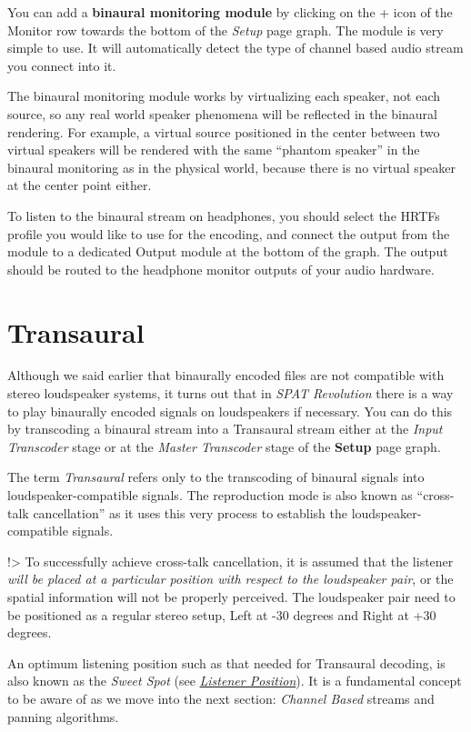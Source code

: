 \documentclass[
  letterpaper,
  DIV=11,
  numbers=noendperiod]{scrreport}
\begin{document}
You can add a \textbf{binaural monitoring module} by clicking on the +
icon of the Monitor row towards the bottom of the \emph{Setup} page
graph. The module is very simple to use. It will automatically detect
the type of channel based audio stream you connect into it.

The binaural monitoring module works by virtualizing each speaker, not
each source, so any real world speaker phenomena will be reflected in
the binaural rendering. For example, a virtual source positioned in the
center between two virtual speakers will be rendered with the same
``phantom speaker'' in the binaural monitoring as in the physical world,
because there is no virtual speaker at the center point either.

To listen to the binaural stream on headphones, you should select the
HRTFs profile you would like to use for the encoding, and connect the
output from the module to a dedicated Output module at the bottom of the
graph. The output should be routed to the headphone monitor outputs of
your audio hardware.

\hypertarget{transaural}{%
\chapter{Transaural}\label{transaural}}

Although we said earlier that binaurally encoded files are not
compatible with stereo loudspeaker systems, it turns out that in
\emph{SPAT Revolution} there is a way to play binaurally encoded signals
on loudspeakers if necessary. You can do this by transcoding a binaural
stream into a Transaural stream either at the \emph{Input Transcoder}
stage or at the \emph{Master Transcoder} stage of the \textbf{Setup}
page graph.

The term \emph{Transaural} refers only to the transcoding of binaural
signals into loudspeaker-compatible signals. The reproduction mode is
also known as ``cross-talk cancellation'' as it uses this very process
to establish the loudspeaker-compatible signals.

!\textgreater{} To successfully achieve cross-talk cancellation, it is
assumed that the listener \emph{will be placed at a particular position
with respect to the loudspeaker pair}, or the spatial information will
not be properly perceived. The loudspeaker pair need to be positioned as
a regular stereo setup, Left at -30 degrees and Right at +30 degrees.

An optimum listening position such as that needed for Transaural
decoding, is also known as the \emph{Sweet Spot} (see
\href{Spatialisation_Technology_Listener_Position.md}{\emph{Listener
Position}}). It is a fundamental concept to be aware of as we move into
the next section: \emph{Channel Based} streams and panning algorithms.
\end{document}
